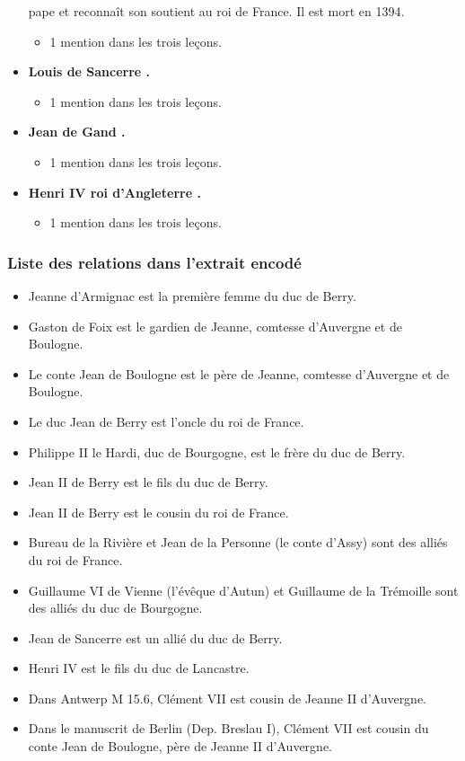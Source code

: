 \documentclass[12pt, a4paper]{article}
\begin{document}
\begin{itemize}
{              pape et reconnaît son soutient au roi de France. Il est mort en 1394. \begin{itemize} \item{1 mention dans les trois leçons.}  \end{itemize}}  \item{\textbf{
              Louis
              de
              Sancerre
            .}  \begin{itemize} \item{1 mention dans les trois leçons.}  \end{itemize}}  \item{\textbf{
              Jean
              de
              Gand
            .}  \begin{itemize} \item{1 mention dans les trois leçons.}  \end{itemize}}  \item{\textbf{
              Henri
              IV
              roi d'Angleterre
            .}  \begin{itemize} \item{1 mention dans les trois leçons.}  \end{itemize}} \end{itemize}
        
        \subsubsection{Liste des relations dans l'extrait encodé}
         \begin{itemize} \item{ Jeanne d'Armignac est la première femme du duc de Berry.}  \item{ Gaston de Foix est le gardien de Jeanne, comtesse d'Auvergne et de Boulogne.}  \item{ Le conte Jean de Boulogne est le père de Jeanne, comtesse d'Auvergne et de Boulogne.}  \item{ Le duc Jean de Berry est l'oncle du roi de France.}  \item{ Philippe II le Hardi, duc de Bourgogne, est le frère du duc de Berry.}  \item{ Jean II de Berry est le fils du duc de Berry.}  \item{ Jean II de Berry est le cousin du roi de France.}  \item{ Bureau de la Rivière et Jean de la Personne (le conte d'Assy) sont des alliés du roi de France.}  \item{ Guillaume VI de Vienne (l'évêque d'Autun) et Guillaume de la Trémoille sont des alliés du duc de Bourgogne.}  \item{ Jean de Sancerre est un allié du duc de Berry.}  \item{ Henri IV est le fils du duc de Lancastre.}  \item{ Dans Antwerp M 15.6, Clément VII est cousin de Jeanne II d'Auvergne.}  \item{ Dans le manuscrit de Berlin (Dep. Breslau I), Clément VII est cousin du conte Jean de Boulogne, père de Jeanne II d'Auvergne.}  \end{itemize} 
        
\end{document}
